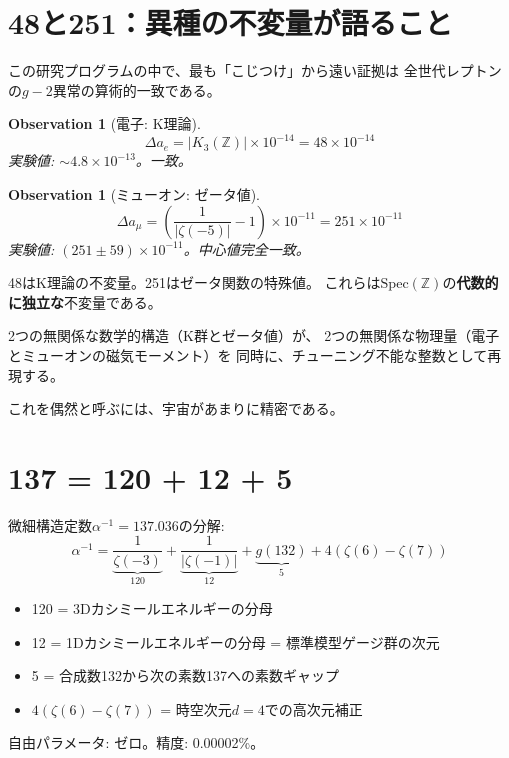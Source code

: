 \documentclass[11pt,a4paper]{article}
\newtheorem{observation}[theorem]{Observation}
\newcommand{\Spec}{\mathrm{Spec}}
\begin{document}
\section{48と251：異種の不変量が語ること}

この研究プログラムの中で、最も「こじつけ」から遠い証拠は
全世代レプトンの$g-2$異常の算術的一致である。

\begin{observation}[電子: K理論]
$$\Delta a_e = |K_3(\mathbb{Z})| \times 10^{-14} = 48 \times 10^{-14}$$
実験値: $\sim 4.8 \times 10^{-13}$。一致。
\end{observation}

\begin{observation}[ミューオン: ゼータ値]
$$\Delta a_\mu = \left(\frac{1}{|\zeta(-5)|} - 1\right) \times 10^{-11} = 251 \times 10^{-11}$$
実験値: $(251 \pm 59) \times 10^{-11}$。中心値完全一致。
\end{observation}

48はK理論の不変量。251はゼータ関数の特殊値。
これらは$\Spec(\mathbb{Z})$の\textbf{代数的に独立な}不変量である。

\begin{epigraph}
2つの無関係な数学的構造（K群とゼータ値）が、
2つの無関係な物理量（電子とミューオンの磁気モーメント）を
同時に、チューニング不能な整数として再現する。

これを偶然と呼ぶには、宇宙があまりに精密である。
\end{epigraph}

\section{137 = 120 + 12 + 5}

微細構造定数$\alpha^{-1} = 137.036$の分解:
$$\alpha^{-1} = \underbrace{\frac{1}{\zeta(-3)}}_{120} + \underbrace{\frac{1}{|\zeta(-1)|}}_{12} + \underbrace{g(132)}_{5} + 4(\zeta(6) - \zeta(7))$$

\begin{itemize}
\item 120 = 3Dカシミールエネルギーの分母
\item 12 = 1Dカシミールエネルギーの分母 = 標準模型ゲージ群の次元
\item 5 = 合成数132から次の素数137への素数ギャップ
\item $4(\zeta(6)-\zeta(7))$ = 時空次元$d=4$での高次元補正
\end{itemize}

自由パラメータ: ゼロ。精度: 0.00002\%。
\end{document}
